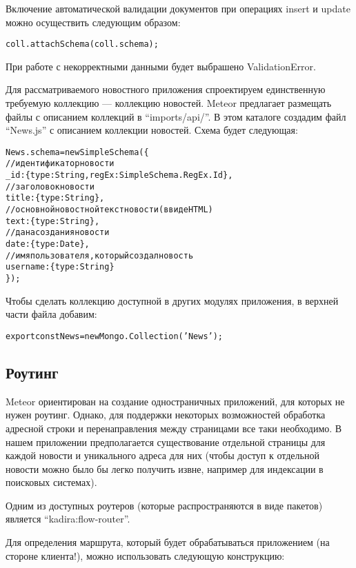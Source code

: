 \documentclass[a4paper,12pt]{article}
\begin{document}
Включение автоматической валидации документов при операциях
insert и update можно осуществить следующим образом:

\begin{alltt}
	coll.attachSchema(coll.schema);
\end{alltt}

При работе с некорректными данными будет выбрашено ValidationError.

Для рассматриваемого новостного приложения спроектируем единственную
требуемую коллекцию --- коллекцию новостей. Meteor предлагает размещать
файлы с описанием коллекций в ``imports/api/''. В этом каталоге
создадим файл ``News.js'' с описанием коллекции новостей.
Схема будет следующая:

\begin{alltt}
News.schema = new SimpleSchema(\{
	// идентификатор новости
    \_id: \{ type: String, regEx: SimpleSchema.RegEx.Id \},
    // заголовок новости
    title: \{ type: String \},
    // основной новостной текст новости (в виде HTML)
    text: \{ type: String \},
    // дана создания новости
    date: \{ type: Date \},
    // имя пользователя, который создал новость
    username : \{ type: String \}
\});
\end{alltt}

Чтобы сделать коллекцию доступной в других модулях
приложения, в верхней части файла добавим:

\begin{alltt}
export const News = new Mongo.Collection('News');
\end{alltt}

\subsection{Роутинг}
Meteor ориентирован на создание одностраничных приложений, для которых
не нужен роутинг. Однако, для поддержки некоторых возможностей обработка
адресной строки и перенаправления между страницами все таки необходимо.
В нашем приложении предполагается существование отдельной страницы
для каждой новости и уникального адреса для них (чтобы доступ к
отдельной новости можно было бы легко получить извне, например
для индексации в поисковых системах).

Одним из доступных роутеров (которые распространяются в виде пакетов)
является ``kadira:flow-router''.

Для определения маршрута, который будет обрабатываться приложением
(на стороне клиента!), можно использовать следующую конструкцию:
\end{document}
